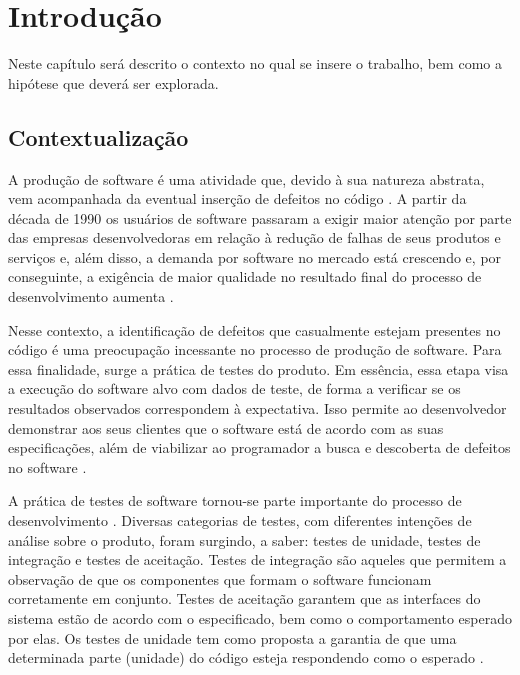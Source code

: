 \chapter[Introdução]{Introdução}

Neste capítulo será descrito o contexto no qual se insere o trabalho, bem como a hipótese que deverá ser explorada.

 \section{Contextualização}
  \indent A produção de software é uma atividade que, devido à sua natureza abstrata, vem acompanhada da eventual inserção de defeitos no código \cite{trodo_2009}. A partir da década de 1990 os usuários de software passaram a exigir maior atenção por parte das empresas desenvolvedoras em relação à redução de falhas de seus produtos e serviços \cite{sommerville_2007} e, além disso, a demanda por software no mercado está crescendo \cite{philipson_2004} e, por conseguinte, a exigência de maior qualidade no resultado final do processo de desenvolvimento aumenta \cite{barbosa_et_al_2009}.
  \par
  \indent Nesse contexto, a identificação de defeitos que casualmente estejam presentes no código é uma preocupação incessante no processo de produção de software. Para essa finalidade, surge a prática de testes do produto. Em essência, essa etapa visa a execução do software alvo com dados de teste, de forma a verificar se os resultados observados correspondem à expectativa. Isso permite ao desenvolvedor demonstrar aos seus clientes que o software está de acordo com as suas especificações, além de viabilizar ao programador a busca e descoberta de defeitos no software \cite{sommerville_2007}.
  \par
  \indent A prática de testes de software tornou-se parte importante do processo de desenvolvimento \cite{barbosa_et_al_2009}. Diversas categorias de testes, com diferentes intenções de análise sobre o produto, foram surgindo, a saber: testes de unidade, testes de integração e testes de aceitação. Testes de integração são aqueles que permitem a observação de que os componentes que formam o software funcionam corretamente em conjunto. Testes de aceitação garantem que as interfaces do sistema estão de acordo com o especificado, bem como o comportamento esperado por elas. Os testes de unidade tem como proposta a garantia  de que uma determinada parte (unidade) do código esteja respondendo como o esperado \cite{sommerville_2007}.
  \par
